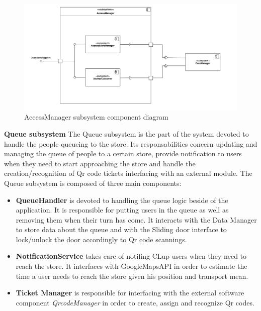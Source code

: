 \documentclass[]{article}
\begin{document}
	\begin{figure}[H]
			\centering
			\includegraphics[scale=0.6]{ComponentView/AccessManagerComponent.png}
			\caption{AccessManager subsystem component diagram}
			\label{fig:AccessManagerDiagram}
		\end{figure}
		\bigskip\bigskip
	
	
	\textbf{Queue subsystem} \newline
	The Queue subsystem is the part of the system devoted to handle the people queueing to the store.
	Its responsabilities concern updating and managing the queue of people to a certain store, provide notification to users when they need to start approaching the store and handle the creation/recognition of Qr code tickets interfacing with an external module.
	The Queue subsystem is composed of three main components:
	
	\begin{itemize}
		\item 	\textbf{QueueHandler} is devoted to handling the queue logic beside of the application. It is responsible for putting users in the queue as well as removing them when their turn has come. It interacts with the Data Manager to store data about the queue and with the Sliding door interface to lock/unlock the door accordingly to Qr code scannings.
		
		\item 	\textbf{NotificationService} takes care of notifing CLup users when they need to reach the store. It interfaces with GoogleMapsAPI in order to estimate the time a user needs to reach the store given his position and transport mean.
		
		\item 	\textbf{Ticket Manager} is responsible for interfacing with the external software component \textit{QrcodeManager} in order to create, assign and recognize Qr codes.
		
	
	\end{itemize}
\end{document}
